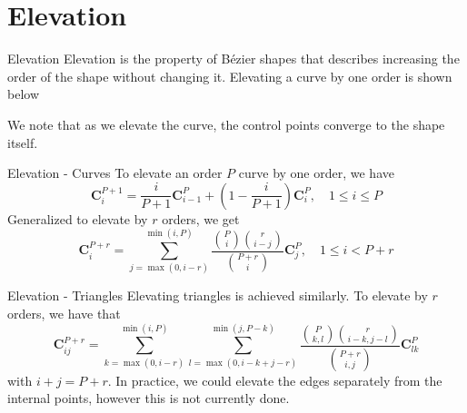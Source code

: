 \documentclass[12pt]{beamer}
\begin{document}
\section{Elevation}
\begin{frame}{Elevation}
Elevation is the property of B{\'e}zier shapes that describes increasing the order of the shape without changing it. Elevating a curve by one order is shown below
\begin{figure}
\centering
{}
\end{figure}
We note that as we elevate the curve, the control points converge to the shape itself.
\end{frame}
\begin{frame}{Elevation - Curves}
To elevate an order $P$ curve by one order, we have
\[ \mathbf{C}^{P+1}_i = \frac{i}{P+1}\mathbf{C}^P_{i-1} + \left(1-\frac{i}{P+1}\right)\mathbf{C}^P_i, \quad 1 \leq i \leq P\]
Generalized to elevate by $r$ orders, we get 
\[
\mathbf{C}^{P+r}_i = \displaystyle \sum_{j = \max(0,i-r)}^{\min(i,P)} \frac{{P \choose i}{r \choose i-j}}{{P+r \choose i}}\mathbf{C}^P_j, \quad 1 \leq i < P+r
\]

\end{frame}
\begin{frame}{Elevation - Triangles}
Elevating triangles is achieved similarly. To elevate by $r$ orders, we have that
\[ \mathbf{C}^{P+r}_{ij} = \displaystyle\sum_{k = \max(0,i-r)}^{\min(i,P)}\sum_{l = \max(0,i-k+j-r)}^{\min(j,P-k)} 
\frac{{P \choose k,l}{r \choose i-k,j-l}}{{P+r \choose i,j}}\mathbf{C}^P_{lk} \]
with $i+j=P+r$. In practice, we could elevate the edges separately from the internal points, however this is not currently done.
\end{frame}
\end{document}

